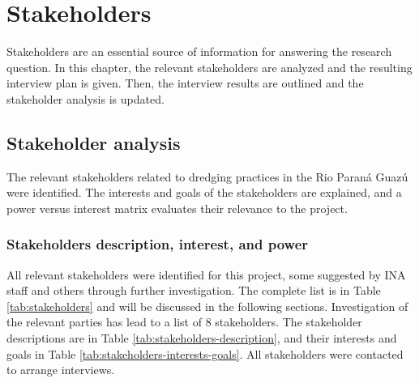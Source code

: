 \chapter{Stakeholders}
\label{chapter:stakeholders}
Stakeholders are an essential source of information for answering the research question. In this chapter, the relevant stakeholders are analyzed and the resulting interview plan is given. Then, the interview results are outlined and the stakeholder analysis is updated. 

\section{Stakeholder analysis} \label{par:stakeholderanalysis}
The relevant stakeholders related to dredging practices in the Rio Paraná Guazú were identified. The interests and goals of the stakeholders are explained, and a power versus interest matrix evaluates their relevance to the project.

\subsection{Stakeholders description, interest, and power}
All relevant stakeholders were identified for this project, some suggested by INA staff and others through further investigation. The complete list is in Table \ref{tab:stakeholders} and will be discussed in the following sections. Investigation of the relevant parties has lead to a list of 8 stakeholders. The stakeholder descriptions are in Table \ref{tab:stakeholders-description}, and their interests and goals in Table \ref{tab:stakeholders-interests-goals}. All stakeholders were contacted to arrange interviews.

